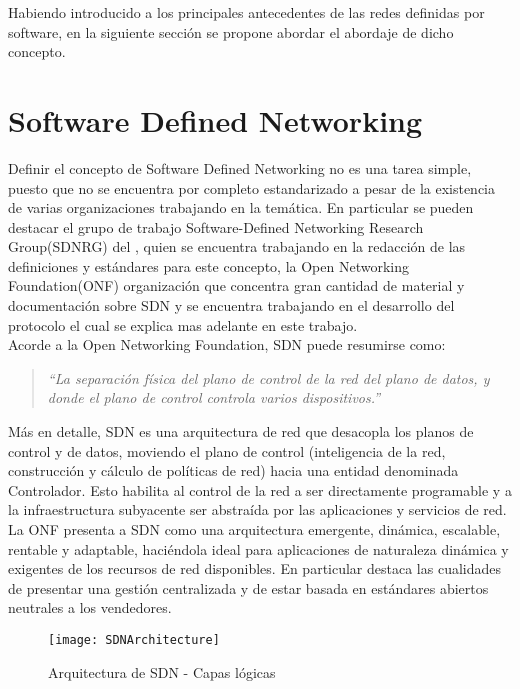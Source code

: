 Habiendo introducido a los principales antecedentes de las redes definidas por software, en la siguiente secci\'on se propone abordar el abordaje de dicho concepto.

\section{Software Defined Networking}
\label{section2.2}

Definir el concepto de Software Defined Networking no es una tarea simple, puesto que no se encuentra por completo estandarizado a pesar de la existencia de varias organizaciones trabajando en la temática. En particular se pueden destacar el grupo de trabajo Software-Defined Networking Research Group(SDNRG) del , quien se encuentra trabajando en la redacción de las definiciones y estándares para este concepto, la Open Networking Foundation(ONF) organización que concentra gran cantidad de material y documentación sobre SDN y se encuentra trabajando en el desarrollo del protocolo  el cual se explica mas adelante en este trabajo.\\

Acorde a la Open Networking Foundation, SDN puede resumirse como:

\begin{quote}
\textit{``La separación física del plano de control de la red del plano de datos, y donde el plano de control controla varios dispositivos.''}
\end{quote}

Más en detalle, SDN es una arquitectura de red que desacopla los planos de control y de datos, moviendo el plano de control (inteligencia de la red, construcción y c\'alculo de políticas de red) hacia una entidad denominada Controlador. Esto habilita al control de la red a ser directamente programable y a la infraestructura subyacente ser abstraída por las aplicaciones y servicios de red.\\ 

La ONF presenta a SDN como una arquitectura emergente, dinámica, escalable, rentable y adaptable, haciéndola ideal para aplicaciones de naturaleza dinámica y exigentes de los recursos de red disponibles. En particular destaca las cualidades de presentar una gestión centralizada y de estar basada en estándares abiertos neutrales a los vendedores.\\

\begin{figure}[htbp!] 
\centering    
\texttt{[image: SDNArchitecture]}
\caption[Arquitectura de SDN - Capas lógicas]{Arquitectura de SDN - Capas lógicas}
\label{fig:SDNArchitecture}
\end{figure}

